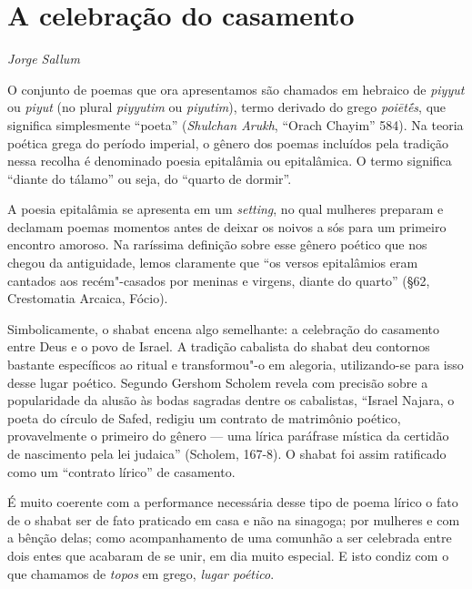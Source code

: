 \chapter*{A celebração do casamento}

\begin{flushright}
\emph{Jorge Sallum}
\end{flushright}

O conjunto de poemas que ora apresentamos são chamados em hebraico de
\emph{piyyut} ou \emph{piyut} (no plural \emph{piyyutim} ou
\emph{piyutim}), termo derivado do grego \emph{poiētḗs}, que significa
simplesmente ``poeta'' (\emph{Shulchan Arukh}, ``Orach Chayim'' 584). Na
teoria poética grega do período imperial, o gênero dos poemas incluídos
pela tradição nessa recolha é denominado poesia epitalâmia ou
epitalâmica. O termo significa ``diante do tálamo'' ou seja, do ``quarto
de dormir''.

A poesia epitalâmia se apresenta em um \emph{setting}, no qual mulheres
preparam e declamam poemas momentos antes de deixar os noivos a sós para
um primeiro encontro amoroso. Na raríssima definição sobre esse gênero
poético que nos chegou da antiguidade, lemos claramente que ``os versos
epitalâmios eram cantados aos recém"-casados por meninas e virgens,
diante do quarto'' (§62, Crestomatia Arcaica, Fócio).

Simbolicamente, o shabat encena algo semelhante: a celebração do
casamento entre Deus e o povo de Israel. A tradição cabalista do shabat
deu contornos bastante específicos ao ritual e transformou"-o em
alegoria, utilizando-se para isso desse lugar poético. Segundo Gershom
Scholem revela com precisão sobre a popularidade da alusão às bodas
sagradas dentre os cabalistas, ``Israel Najara, o poeta do círculo de
Safed, redigiu um contrato de matrimônio poético, provavelmente o
primeiro do gênero --- uma lírica paráfrase mística da certidão de
nascimento pela lei judaica'' (Scholem, 167-8). O shabat foi assim
ratificado como um ``contrato lírico'' de casamento.

É muito coerente com a performance necessária desse tipo de poema lírico
o fato de o shabat ser de fato praticado em casa e não na sinagoga; por
mulheres e com a bênção delas; como acompanhamento de uma comunhão a ser
celebrada entre dois entes que acabaram de se unir, em dia muito
especial. E isto condiz com o que chamamos de \emph{topos} em grego,
\emph{lugar poético}.

